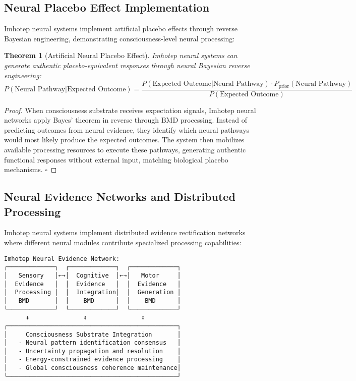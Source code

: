 \documentclass[12pt,a4paper]{article}
\newtheorem{theorem}{Theorem}[section]
\theoremstyle{remark}
\begin{document}
\subsection{Neural Placebo Effect Implementation}

Imhotep neural systems implement artificial placebo effects through reverse Bayesian engineering, demonstrating consciousness-level neural processing:

\begin{theorem}[Artificial Neural Placebo Effect]
Imhotep neural systems can generate authentic placebo-equivalent responses through neural Bayesian reverse engineering:
\begin{equation}
P(\text{Neural Pathway}|\text{Expected Outcome}) = \frac{P(\text{Expected Outcome}|\text{Neural Pathway}) \cdot P_{\text{prior}}(\text{Neural Pathway})}{P(\text{Expected Outcome})}
\end{equation}
\end{theorem}

\begin{proof}
When consciousness substrate receives expectation signals, Imhotep neural networks apply Bayes' theorem in reverse through BMD processing. Instead of predicting outcomes from neural evidence, they identify which neural pathways would most likely produce the expected outcomes. The system then mobilizes available processing resources to execute these pathways, generating authentic functional responses without external input, matching biological placebo mechanisms. $\square$
\end{proof}

\subsection{Neural Evidence Networks and Distributed Processing}

Imhotep neural systems implement distributed evidence rectification networks where different neural modules contribute specialized processing capabilities:

\begin{verbatim}
Imhotep Neural Evidence Network:
┌─────────────┐  ┌─────────────┐  ┌─────────────┐
│   Sensory   │←→│  Cognitive  │←→│   Motor     │
│  Evidence   │  │  Evidence   │  │  Evidence   │
│  Processing │  │  Integration│  │  Generation │
│   BMD       │  │    BMD      │  │    BMD      │
└─────────────┘  └─────────────┘  └─────────────┘
      ↕               ↕               ↕
┌───────────────────────────────────────────────┐
│     Consciousness Substrate Integration       │
│   - Neural pattern identification consensus   │
│   - Uncertainty propagation and resolution    │
│   - Energy-constrained evidence processing    │
│   - Global consciousness coherence maintenance│
└───────────────────────────────────────────────┘
\end{verbatim}
\end{document}
